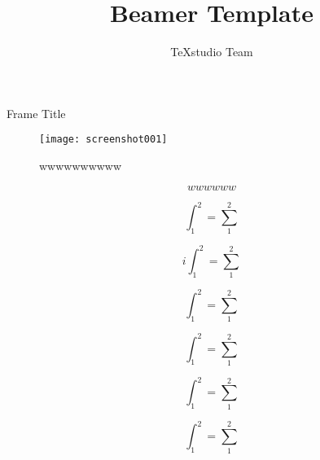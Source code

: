 \documentclass[professionalfont, aspectratio=169]{beamer}
\title{Beamer Template}
\author{TeXstudio Team}
\begin{document}
\begin{frame}[plain]
	\maketitle
\end{frame}
\begin{frame}{Frame Title}
	\begin{figure}[ht!]
		\centering
		\texttt{[image: screenshot001]}
		\caption{wwwwwwwwww}
		\label{fig:www}
	\end{figure}
	\begin{equation}
		wwwwww
		\label{www}
	\end{equation}
\end{frame}


\begin{frame}
	\begin{equation}\label{key}
		\int_{1}^{2}=\sum_{1}^{2} 
	\end{equation}
\end{frame}
\begin{frame}
	\begin{equation}\label{key}
		i	\int_{1}^{2}=\sum_{1}^{2}
	\end{equation}
\end{frame}
\begin{frame}
	\begin{equation}\label{key}
		\int_{1}^{2}=\sum_{1}^{2}
	\end{equation}
\end{frame}
\begin{frame}
	\begin{equation}\label{key}
		\int_{1}^{2}=\sum_{1}^{2}
	\end{equation}
\end{frame}
\begin{frame}
	\begin{equation}\label{key}
		\int_{1}^{2}=\sum_{1}^{2}
	\end{equation}
\end{frame}
\begin{frame}
	\begin{equation}\label{key}
		\int_{1}^{2}=\sum_{1}^{2}
	\end{equation}
\end{frame}
\end{document}
